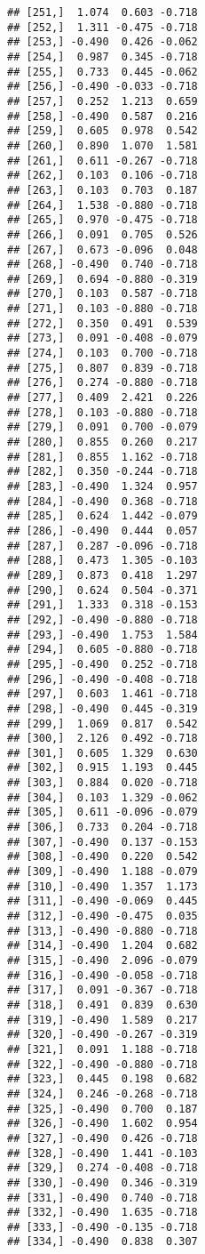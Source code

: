 \documentclass[
]{article}
\begin{document}
\begin{verbatim}
## [251,]  1.074  0.603 -0.718
## [252,]  1.311 -0.475 -0.718
## [253,] -0.490  0.426 -0.062
## [254,]  0.987  0.345 -0.718
## [255,]  0.733  0.445 -0.062
## [256,] -0.490 -0.033 -0.718
## [257,]  0.252  1.213  0.659
## [258,] -0.490  0.587  0.216
## [259,]  0.605  0.978  0.542
## [260,]  0.890  1.070  1.581
## [261,]  0.611 -0.267 -0.718
## [262,]  0.103  0.106 -0.718
## [263,]  0.103  0.703  0.187
## [264,]  1.538 -0.880 -0.718
## [265,]  0.970 -0.475 -0.718
## [266,]  0.091  0.705  0.526
## [267,]  0.673 -0.096  0.048
## [268,] -0.490  0.740 -0.718
## [269,]  0.694 -0.880 -0.319
## [270,]  0.103  0.587 -0.718
## [271,]  0.103 -0.880 -0.718
## [272,]  0.350  0.491  0.539
## [273,]  0.091 -0.408 -0.079
## [274,]  0.103  0.700 -0.718
## [275,]  0.807  0.839 -0.718
## [276,]  0.274 -0.880 -0.718
## [277,]  0.409  2.421  0.226
## [278,]  0.103 -0.880 -0.718
## [279,]  0.091  0.700 -0.079
## [280,]  0.855  0.260  0.217
## [281,]  0.855  1.162 -0.718
## [282,]  0.350 -0.244 -0.718
## [283,] -0.490  1.324  0.957
## [284,] -0.490  0.368 -0.718
## [285,]  0.624  1.442 -0.079
## [286,] -0.490  0.444  0.057
## [287,]  0.287 -0.096 -0.718
## [288,]  0.473  1.305 -0.103
## [289,]  0.873  0.418  1.297
## [290,]  0.624  0.504 -0.371
## [291,]  1.333  0.318 -0.153
## [292,] -0.490 -0.880 -0.718
## [293,] -0.490  1.753  1.584
## [294,]  0.605 -0.880 -0.718
## [295,] -0.490  0.252 -0.718
## [296,] -0.490 -0.408 -0.718
## [297,]  0.603  1.461 -0.718
## [298,] -0.490  0.445 -0.319
## [299,]  1.069  0.817  0.542
## [300,]  2.126  0.492 -0.718
## [301,]  0.605  1.329  0.630
## [302,]  0.915  1.193  0.445
## [303,]  0.884  0.020 -0.718
## [304,]  0.103  1.329 -0.062
## [305,]  0.611 -0.096 -0.079
## [306,]  0.733  0.204 -0.718
## [307,] -0.490  0.137 -0.153
## [308,] -0.490  0.220  0.542
## [309,] -0.490  1.188 -0.079
## [310,] -0.490  1.357  1.173
## [311,] -0.490 -0.069  0.445
## [312,] -0.490 -0.475  0.035
## [313,] -0.490 -0.880 -0.718
## [314,] -0.490  1.204  0.682
## [315,] -0.490  2.096 -0.079
## [316,] -0.490 -0.058 -0.718
## [317,]  0.091 -0.367 -0.718
## [318,]  0.491  0.839  0.630
## [319,] -0.490  1.589  0.217
## [320,] -0.490 -0.267 -0.319
## [321,]  0.091  1.188 -0.718
## [322,] -0.490 -0.880 -0.718
## [323,]  0.445  0.198  0.682
## [324,]  0.246 -0.268 -0.718
## [325,] -0.490  0.700  0.187
## [326,] -0.490  1.602  0.954
## [327,] -0.490  0.426 -0.718
## [328,] -0.490  1.441 -0.103
## [329,]  0.274 -0.408 -0.718
## [330,] -0.490  0.346 -0.319
## [331,] -0.490  0.740 -0.718
## [332,] -0.490  1.635 -0.718
## [333,] -0.490 -0.135 -0.718
## [334,] -0.490  0.838  0.307

\end{verbatim}
\end{document}
